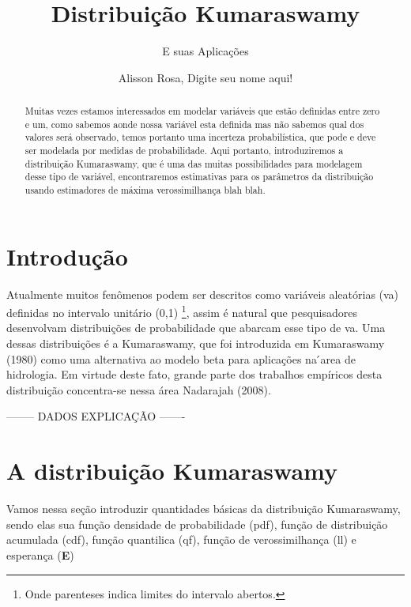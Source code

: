 \documentclass[
]{article}
\title{Distribuição Kumaraswamy}
\subtitle{E suas Aplicações}
\author{Alisson Rosa, Digite seu nome aqui!}
\date{}
\begin{document}
\maketitle
\begin{abstract}
Muitas vezes estamos interessados em modelar variáveis que estão
definidas entre zero e um, como sabemos aonde nossa variável esta
definida mas não sabemos qual dos valores será observado, temos portanto
uma incerteza probabilística, que pode e deve ser modelada por medidas
de probabilidade. Aqui portanto, introduziremos a distribuição
Kumaraswamy, que é uma das muitas possibilidades para modelagem desse
tipo de variável, encontraremos estimativas para os parâmetros da
distribuição usando estimadores de máxima verossimilhança blah blah.
\end{abstract}
\ifdefined\Shaded\renewenvironment{Shaded}{\begin{tcolorbox}[boxrule=0pt, borderline west={3pt}{0pt}{shadecolor}, sharp corners, enhanced, breakable, interior hidden, frame hidden]}{\end{tcolorbox}}\fi

\section{\centering Introdução}

Atualmente muitos fenômenos podem ser descritos como variáveis
aleatórias (va) definidas no intervalo unitário (0,1) \footnote{Onde
  parenteses indica limites do intervalo abertos.}, assim é natural que
pesquisadores desenvolvam distribuições de probabilidade que abarcam
esse tipo de va. Uma dessas distribuições é a Kumaraswamy, que foi
introduzida em Kumaraswamy (1980) como uma alternativa ao modelo beta
para aplicações na ́area de hidrologia. Em virtude deste fato, grande
parte dos trabalhos empíricos desta distribuição concentra-se nessa área
Nadarajah (2008).

-------- DADOS EXPLICAÇÃO -------

\section{\centering A distribuição Kumaraswamy}

Vamos nessa seção introduzir quantidades básicas da distribuição
Kumaraswamy, sendo elas sua função densidade de probabilidade (pdf),
função de distribuição acumulada (cdf), função quantilica (qf), função
de verossimilhança (ll) e esperança (\textbf{E})
\end{document}
